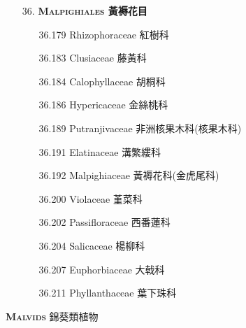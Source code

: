 \begin{enumerate}
\begin{enumerate}
        
    \end{enumerate}
  \item[36. ] \textbf{\textsc{Malpighiales} 黃褥花目}   
    \begin{enumerate}
      \item[36.179] Rhizophoraceae 紅樹科     
        
      \item[36.183] Clusiaceae 藤黃科     
        
      \item[36.184] Calophyllaceae 胡桐科     
        
      \item[36.186] Hypericaceae 金絲桃科     
        
      \item[36.189] Putranjivaceae 非洲核果木科(核果木科)     
        
      \item[36.191] Elatinaceae 溝繁縷科     
        
      \item[36.192] Malpighiaceae 黃褥花科(金虎尾科)     
        
      \item[36.200] Violaceae 堇菜科     
        
      \item[36.202] Passifloraceae 西番蓮科     
        
      \item[36.204] Salicaceae 楊柳科     
        
      \item[36.207] Euphorbiaceae 大戟科     
        
      \item[36.211] Phyllanthaceae 葉下珠科     
        
    \end{enumerate}
\end{enumerate}
\vspace{2ex} 
\noindent \normalsize\textsc{\textbf{Malvids} 錦葵類植物}\selectfont \\
\footnotesize\selectfont
